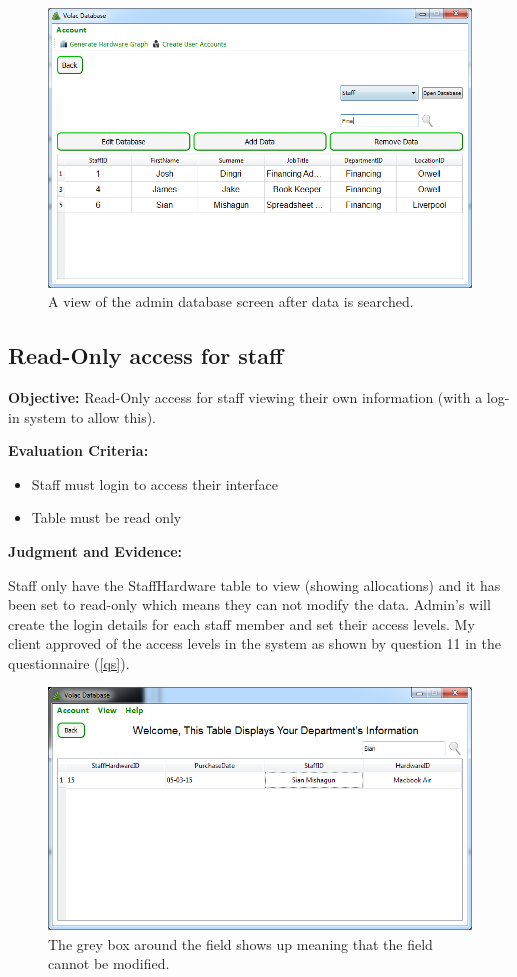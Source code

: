 \begin{figure}[H]
    \includegraphics[width=\textwidth]{./Evaluation/Images/afteradminsearch.png}
    \caption{A view of the admin database screen after data is searched.} 
\end{figure}

\subsection{Read-Only access for staff}

\textbf{Objective:} Read-Only access for staff viewing their own information (with a log-in system to allow this).

\textbf{Evaluation Criteria:}
\begin{itemize}
\item{Staff must login to access their interface}
\item{Table must be read only}
\end{itemize}

\textbf{Judgment and Evidence:}

Staff only have the StaffHardware table to view (showing allocations) and it has been set to read-only which means they can not modify the data. Admin's will create the login details for each staff member and set their access levels. My client approved of the access levels in the system as shown by question 11 in the questionnaire (\ref{qs}).

\begin{figure}[H]
    \includegraphics[width=\textwidth]{./Evaluation/Images/readonlymanager.png}
    \caption{The grey box around the field shows up meaning that the field cannot be modified.} 
\end{figure}

